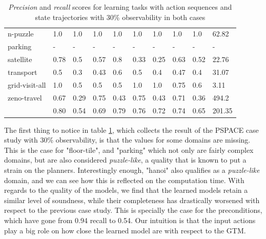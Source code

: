 \begin{table}[hbt!]
\begin{center}
\begin{tabular}{l|l|l|l|l|l|l||l|l|l|}
			n-puzzle & 1.0 & 1.0 & 1.0 & 1.0 & 1.0 & 1.0 & 1.0 & 1.0& 62.82 \\ %
			parking & - & - & - & - & - & - & - & - & - \\ %
			satellite & 0.78 & 0.5 & 0.57 & 0.8 & 0.33 & 0.25 & 0.63 & 0.52& 22.76 \\ %
			transport & 0.5 & 0.3 & 0.43 & 0.6 & 0.5 & 0.4 & 0.47 & 0.4& 31.07 \\ %
			grid-visit-all & 1.0 & 0.5 & 0.5 & 0.5 & 1.0 & 1.0 & 0.75 & 0.6& 3.11 \\ %
			zeno-travel & 0.67 & 0.29 & 0.75 & 0.43 & 0.75 & 0.43 & 0.71 & 0.36& 494.2 \\ %
			\hline
			\bf & 0.80 & 0.54 & 0.69 & 0.79 & 0.76 & 0.72 & 0.74 & 0.65 & 201.35 
			
		\end{tabular}
		
	\end{center}
	\caption{\small {\em Precision} and {\em recall} scores for learning tasks with \PO action sequences and \PO state trajectories with 30\% observability in both cases}
	\label{tab:results_minimum_30_30}
\end{table}

The first thing to notice in table \ref{tab:results_minimum_30_30}, which collects the result of the PSPACE case study with 30\% observability, is that the values for some domains are missing. This is the case for "floor-tile", and "parking" which not only are fairly complex domains, but are also considered \emph{puzzle-like}, a quality that is known to put a strain on the planners. Interestingly enough, "hanoi" also qualifies as a \emph{puzzle-like} domain, and we can see how this is reflected on the computation time. With regards to the quality of the models, we find that the learned models retain a similar level of soundness, while their completeness has drastically worsened with respect to the previous case study. This is specially the case for the preconditions, which have gone from 0.94 recall to 0.54. %
Our intuition is that the input actions play a big role on how close the learned model are with respect to the GTM.

